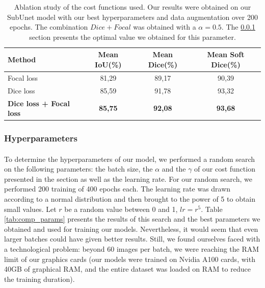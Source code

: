 \documentclass[english]{article}
\begin{document}
\begin{table}[H]
    \footnotesize
    \centering
    \begin{tabular}{ l c c c }
        \hline
        Method & Mean IoU(\%) & Mean Dice(\%) & Mean Soft Dice(\%) \\
        \hline\hline
        Focal loss & 81,29 & 89,17 & 90,39 \\
        Dice loss & 85,59 & 91,78 & 93,32 \\
        \textbf{Dice loss + Focal loss} & \textbf{85,75} & \textbf{92,08} & \textbf{93,68} \\
        \hline
    \end{tabular}
    \caption{Ablation study of the cost functions used. Our results were obtained on our SubUnet model with our best hyperparameters and data augmentation over 200 epochs. The combination \(Dice + Focal\) was obtained with a \(\alpha=0.5\). The \ref{hyperparameters} section presents the optimal value we obtained for this parameter.}
    \label{tab:ablation:loss}
\end{table}

\subsubsection{Hyperparameters}
\label{hyperparameters}
\paragraph{}
To determine the hyperparameters of our model, we performed a random search on the following parameters: the batch size, the \(\alpha\) and the \(\gamma\) of our cost function presented in the  section as well as the learning rate. For our random search, we performed 200 training of 400 epochs each. The learning rate was drawn according to a normal distribution and then brought to the power of 5 to obtain small values. Let \(r\) be a random value between 0 and 1, \(lr = r^5\). Table \ref{tab:comp_params} presents the results of this search and the best parameters we obtained and used for training our models. Nevertheless, it would seem that even larger batches could have given better results. Still, we found ourselves faced with a technological problem: beyond 60 images per batch, we were reaching the RAM limit of our graphics cards (our models were trained on Nvidia A100 cards, with 40GB of graphical RAM, and the entire dataset was loaded on RAM to reduce the training duration).
\end{document}
